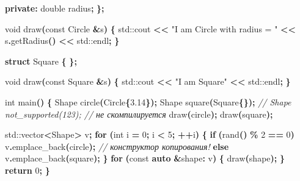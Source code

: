 \documentclass[14pt,a4paper]{article}
\newenvironment{Shaded}{\begin{paragraph}}{\end{paragraph}}
\newenvironment{Highlighting}{\begin{paragraph}}{\end{paragraph}}
\newcommand{\KeywordTok}[1]{\textcolor[rgb]{0.13,0.29,0.53}{\textbf{#1}}}
\newcommand{\DataTypeTok}[1]{\textcolor[rgb]{0.13,0.29,0.53}{#1}}
\newcommand{\DecValTok}[1]{\textcolor[rgb]{0.00,0.00,0.81}{#1}}
\newcommand{\FloatTok}[1]{\textcolor[rgb]{0.00,0.00,0.81}{#1}}
\newcommand{\StringTok}[1]{\textcolor[rgb]{0.31,0.60,0.02}{#1}}
\newcommand{\CommentTok}[1]{\textcolor[rgb]{0.56,0.35,0.01}{\textit{#1}}}
\newcommand{\ControlFlowTok}[1]{\textcolor[rgb]{0.13,0.29,0.53}{\textbf{#1}}}
\newcommand{\OperatorTok}[1]{\textcolor[rgb]{0.81,0.36,0.00}{\textbf{#1}}}
\newcommand{\BuiltInTok}[1]{#1}
\newcommand{\AttributeTok}[1]{\textcolor[rgb]{0.77,0.63,0.00}{#1}}
\newcommand{\NormalTok}[1]{#1}
\begin{document}
\begin{Shaded}
\begin{Highlighting}[]
\KeywordTok{private}\OperatorTok{:}
    \DataTypeTok{double}\NormalTok{ radius}\OperatorTok{;}
\OperatorTok{\};}

\DataTypeTok{void}\NormalTok{ draw}\OperatorTok{(}\AttributeTok{const}\NormalTok{ Circle }\OperatorTok{\&}\NormalTok{s}\OperatorTok{)} \OperatorTok{\{}
    \BuiltInTok{std::}\NormalTok{cout}\OperatorTok{ \textless{}\textless{}} \StringTok{"I am Circle with radius = "} \OperatorTok{\textless{}\textless{}}
\NormalTok{              s}\OperatorTok{.}\NormalTok{getRadius}\OperatorTok{()} \OperatorTok{\textless{}\textless{}} \BuiltInTok{std::}\NormalTok{endl}\OperatorTok{;}
\OperatorTok{\}}

\KeywordTok{struct}\NormalTok{ Square }\OperatorTok{\{}
\OperatorTok{\};}

\DataTypeTok{void}\NormalTok{ draw}\OperatorTok{(}\AttributeTok{const}\NormalTok{ Square }\OperatorTok{\&}\NormalTok{s}\OperatorTok{)} \OperatorTok{\{}
    \BuiltInTok{std::}\NormalTok{cout}\OperatorTok{ \textless{}\textless{}} \StringTok{"I am Square"} \OperatorTok{\textless{}\textless{}} \BuiltInTok{std::}\NormalTok{endl}\OperatorTok{;}
\OperatorTok{\}}

\DataTypeTok{int}\NormalTok{ main}\OperatorTok{()} \OperatorTok{\{}
\NormalTok{    Shape circle}\OperatorTok{(}\NormalTok{Circle}\OperatorTok{\{}\FloatTok{3.14}\OperatorTok{\});}
\NormalTok{    Shape square}\OperatorTok{(}\NormalTok{Square}\OperatorTok{\{\});}
    \CommentTok{// Shape not\_supported(123); // не скомпилируется}
\NormalTok{    draw}\OperatorTok{(}\NormalTok{circle}\OperatorTok{);}
\NormalTok{    draw}\OperatorTok{(}\NormalTok{square}\OperatorTok{);}

    \BuiltInTok{std::}\NormalTok{vector}\OperatorTok{\textless{}}\NormalTok{Shape}\OperatorTok{\textgreater{}}\NormalTok{ v}\OperatorTok{;}
    \ControlFlowTok{for} \OperatorTok{(}\DataTypeTok{int}\NormalTok{ i }\OperatorTok{=} \DecValTok{0}\OperatorTok{;}\NormalTok{ i }\OperatorTok{\textless{}} \DecValTok{5}\OperatorTok{;} \OperatorTok{++}\NormalTok{i}\OperatorTok{)} \OperatorTok{\{}
        \ControlFlowTok{if} \OperatorTok{(}\NormalTok{rand}\OperatorTok{()} \OperatorTok{\%} \DecValTok{2} \OperatorTok{==} \DecValTok{0}\OperatorTok{)}
\NormalTok{            v}\OperatorTok{.}\NormalTok{emplace\_back}\OperatorTok{(}\NormalTok{circle}\OperatorTok{);} \CommentTok{// конструктор копирования!}
        \ControlFlowTok{else}
\NormalTok{            v}\OperatorTok{.}\NormalTok{emplace\_back}\OperatorTok{(}\NormalTok{square}\OperatorTok{);}
    \OperatorTok{\}}
    \ControlFlowTok{for} \OperatorTok{(}\AttributeTok{const} \KeywordTok{auto} \OperatorTok{\&}\NormalTok{shape}\OperatorTok{:}\NormalTok{ v}\OperatorTok{)} \OperatorTok{\{}
\NormalTok{        draw}\OperatorTok{(}\NormalTok{shape}\OperatorTok{);}
    \OperatorTok{\}}
    \ControlFlowTok{return} \DecValTok{0}\OperatorTok{;}
\OperatorTok{\}}
\end{Highlighting}
\end{Shaded}
\end{document}
